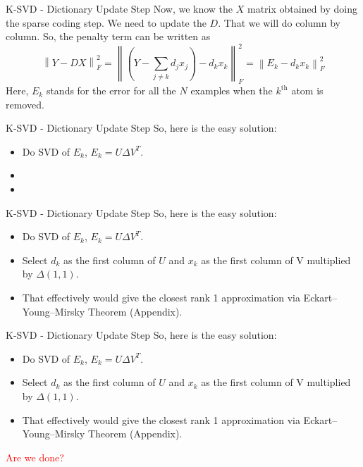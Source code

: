 \documentclass{beamer}
\begin{document}
\begin{frame}{K-SVD - Dictionary Update Step}
Now, we know the $X$ matrix obtained by doing the sparse coding step.
We need to update the $D$. That we will do column by column.
So, the penalty term can be written as
\[
\left\|Y-DX\right\|_F^2
=
\left\|
\left(
Y-\sum_{j\neq k} d_jx_j
\right)-d_kx_k
\right\|_F^2
=
\left\|E_k-d_kx_k\right\|_F^2
\]
Here, $E_k$ stands for the error for all the $N$ examples when the
$k^{\text{th}}$ atom is removed.
\end{frame}

\begin{frame}{K-SVD - Dictionary Update Step}
So, here is the easy solution:
\begin{itemize}
    \item Do SVD of $E_k$, $E_k = U \Delta V^T$.
    \item[] \phantom{Select $d_k$ as the first column of $U$ and $x_k$ as the first column of V multiplied by $\Delta(1,1)$.}
    \item[] \phantom{That effectively would give the closest rank 1 approximation via Eckart–Young–Mirsky Theorem (Appendix).}
\end{itemize}

\phantom{\textcolor{red}{Are we done?}}
\end{frame}

\begin{frame}{K-SVD - Dictionary Update Step}
So, here is the easy solution:
\begin{itemize}
    \item Do SVD of $E_k$, $E_k = U \Delta V^T$.
    \item Select $d_k$ as the first column of $U$ and $x_k$ as the first column of V multiplied by $\Delta(1,1)$.
    \item That effectively would give the closest rank 1 approximation via Eckart–Young–Mirsky Theorem (Appendix).
\end{itemize}

\phantom{\textcolor{red}{Are we done?}}
\end{frame}

\begin{frame}{K-SVD - Dictionary Update Step}
So, here is the easy solution:
\begin{itemize}
    \item Do SVD of $E_k$, $E_k = U \Delta V^T$.
    \item Select $d_k$ as the first column of $U$ and $x_k$ as the first column of V multiplied by $\Delta(1,1)$.
    \item That effectively would give the closest rank 1 approximation via Eckart–Young–Mirsky Theorem (Appendix).
\end{itemize}

\textcolor{red}{Are we done?}
\end{frame}
\end{document}
